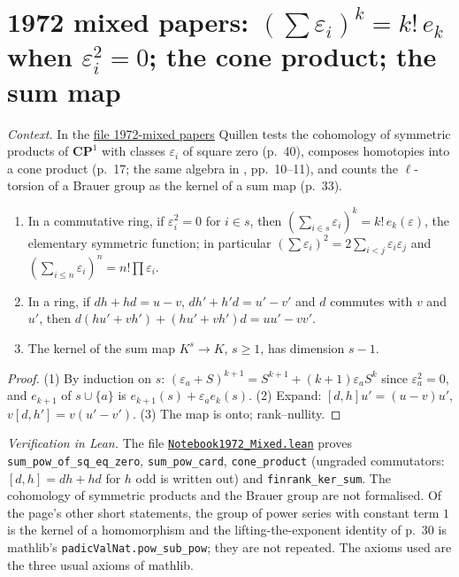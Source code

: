 \section[1972 mixed papers: square-zero symmetric functions; the cone product]{1972 mixed papers: $(\sum\varepsilon_i)^k = k!\,e_k$ when $\varepsilon_i^2 = 0$; the cone product; the sum map\protect{}}\label{sec:quillen-1972-mixed}

\emph{Context.} In the \href{https://www.claymath.org/library/Quillen/Working_papers/quillen\%201972/1972-mixed\%20papers.pdf}{file 1972-mixed papers} Quillen tests the cohomology of symmetric products of $\mathbf{CP}^1$ with classes $\varepsilon_i$ of square zero (p.~40), composes homotopies into a cone product (p.~17; the same algebra in , pp.~10--11), and counts the $\ell$-torsion of a Brauer group as the kernel of a sum map (p.~33).

\begin{encadre}
\begin{theoreme}\label{thm:quillen-1972-mixed}\leavevmode
\begin{enumerate}
\item In a commutative ring, if $\varepsilon_i^2 = 0$ for $i \in s$, then $(\sum_{i\in s}\varepsilon_i)^k = k!\,e_k(\varepsilon)$, the elementary symmetric function; in particular $(\sum\varepsilon_i)^2 = 2\sum_{i<j}\varepsilon_i\varepsilon_j$ and $(\sum_{i\le n}\varepsilon_i)^n = n!\prod\varepsilon_i$.
\item In a ring, if $dh + hd = u - v$, $dh' + h'd = u' - v'$ and $d$ commutes with $v$ and $u'$, then $d(hu' + vh') + (hu' + vh')d = uu' - vv'$.
\item The kernel of the sum map $K^s \to K$, $s \ge 1$, has dimension $s - 1$.
\end{enumerate}
\end{theoreme}
\end{encadre}

\begin{proof}
(1) By induction on $s$: $(\varepsilon_a + S)^{k+1} = S^{k+1} + (k + 1)\varepsilon_aS^k$ since $\varepsilon_a^2 = 0$, and $e_{k+1}$ of $s \cup \{a\}$ is $e_{k+1}(s) + \varepsilon_ae_k(s)$. (2) Expand: $[d, h]u' = (u - v)u'$, $v[d, h'] = v(u' - v')$. (3) The map is onto; rank--nullity.
\end{proof}

\emph{Verification in Lean.} The file \href{\leanblobmain/Notebook1972_Mixed.lean}{\texttt{Notebook1972\_Mixed.\allowbreak{}lean}} proves \texttt{sum\_pow\_of\_sq\_eq\_zero}, \texttt{sum\_pow\_card}, \texttt{cone\_product} (ungraded commutators: $[d, h] = dh + hd$ for $h$ odd is written out) and \texttt{finrank\_ker\_sum}. The cohomology of symmetric products and the Brauer group are not formalised. Of the page's other short statements, the group of power series with constant term $1$ is the kernel of a homomorphism and the lifting-the-exponent identity of p.~30 is mathlib's \texttt{padicValNat.pow\_sub\_pow}; they are not repeated. The axioms used are the three usual axioms of mathlib.

